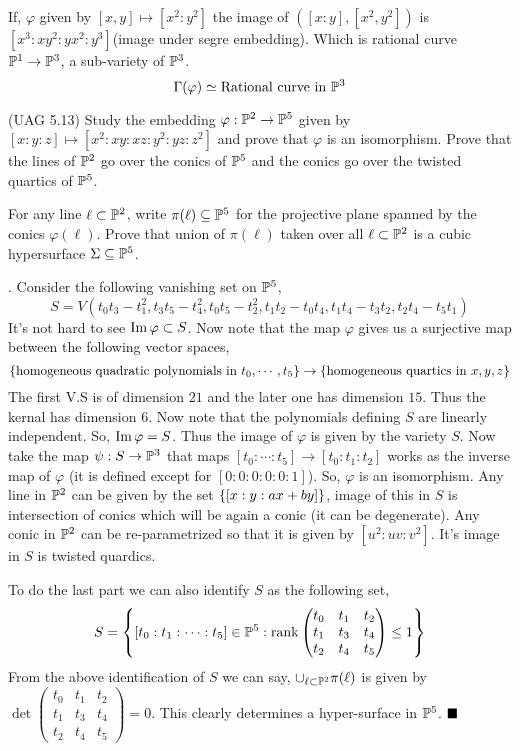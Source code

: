 \documentclass[12pt]{article}
\begin{document}
\vspace*{0.2cm}

\noindent If, $\varphi$ given by $[x,y]\mapsto [x^2:y^2]$ the image of $([x:y],[x^2,y^2])$ is $[x^3:xy^2:yx^2:y^3]$(image under segre embedding). Which is rational curve $\mathbb{P}^1 \to \mathbb{P}^3$, a sub-variety of $\mathbb{P}^3$.
$$\Gamma(\varphi)\simeq \text{Rational curve in }\mathbb{P}^3$$

\begin{prob} %
    (UAG 5.13) Study the embedding $\varphi : \mathbb{P}^2 \to \mathbb{P}^5$ given by $[x:y:z] \mapsto [x^2:xy:xz:y^2:yz:z^2]$ and prove that $\varphi$ is an isomorphism. Prove that the lines of $\mathbb{P}^2$ go over the conics of $\mathbb{P}^5$ and the conics go over the twisted quartics of $\mathbb{P}^5$.

    \vspace*{0.2cm}

    \noindent For any line $\ell \subset \mathbb{P}^2$, write $\pi(\ell) \subseteq \mathbb{P}^5$ for the projective plane spanned by the conics $\varphi(\ell)$. Prove that union of $\pi(\ell)$ taken over all $\ell \subset \mathbb{P}^2$ is a cubic hypersurface $\Sigma \subseteq \mathbb{P}^5$.
\end{prob}

\sol. Consider the following vanishing set on $\mathbb{P}^5$, $$S = V(t_0t_3-t_1^2, t_3t_5-t_4^2,t_0t_5-t_2^2,t_1t_2-t_0t_4,t_1t_4-t_3t_2,t_2t_4-t_5t_1)$$
It's not hard to see $\operatorname{Im} \varphi \subset S$. Now note that the map $\varphi$ gives us a surjective map between the following vector spaces, \[
 \qty{\text{homogeneous quadratic polynomials in }t_0,\cdots,t_5} \to  \qty{\text{homogeneous quartics in } x,y,z}    
\] 
The first V.S is of dimension $21$ and the later one has dimension $15$. Thus the kernal has dimension $6$. Now note that the polynomials defining $S$ are linearly independent. So, $\operatorname{Im} \varphi = S$. Thus the image of $\varphi$ is given by the variety $S$. Now take the map $\psi : S \to \mathbb{P}^3$ that maps $[t_0:\cdots:t_5] \to [t_0:t_1:t_2]$ works as the inverse map of $\varphi$ (it is defined except for $[0:0:0:0:0:1]$). So, $\varphi$ is an isomorphism. Any line in $\mathbb{P}^2$ can be given by the set $\qty{[x:y:ax+by]}$, image of this in $S$ is intersection of conics which will be again a conic (it can be degenerate). Any conic in $\mathbb{P}^2$ can be re-parametrized so that it is given by $[u^2:uv:v^2]$. It's image in $S$ is twisted quardics. 

\vspace*{0.2cm}

\noindent To do the last part we can also identify $S$ as the following set,\[S = \qty{ [t_0:t_1:\cdots:t_5] \in \mathbb{P}^5:\operatorname{rank }\begin{pmatrix}
    t_0 & t_1 & t_2 \\
    t_1 & t_3 & t_4 \\
    t_2 & t_4 & t_5
\end{pmatrix} \leq 1}\] From the above identification of $S$ we can say, $\cup_{\ell \subset \mathbb{P}^2}\pi(\ell)$ is given by $\det \begin{pmatrix}
    t_0 & t_1 & t_2 \\
    t_1 & t_3 & t_4 \\
    t_2 & t_4 & t_5
\end{pmatrix}=0$. This clearly determines a hyper-surface in $\mathbb{P}^5$. $\hfill \blacksquare$
\end{document}
